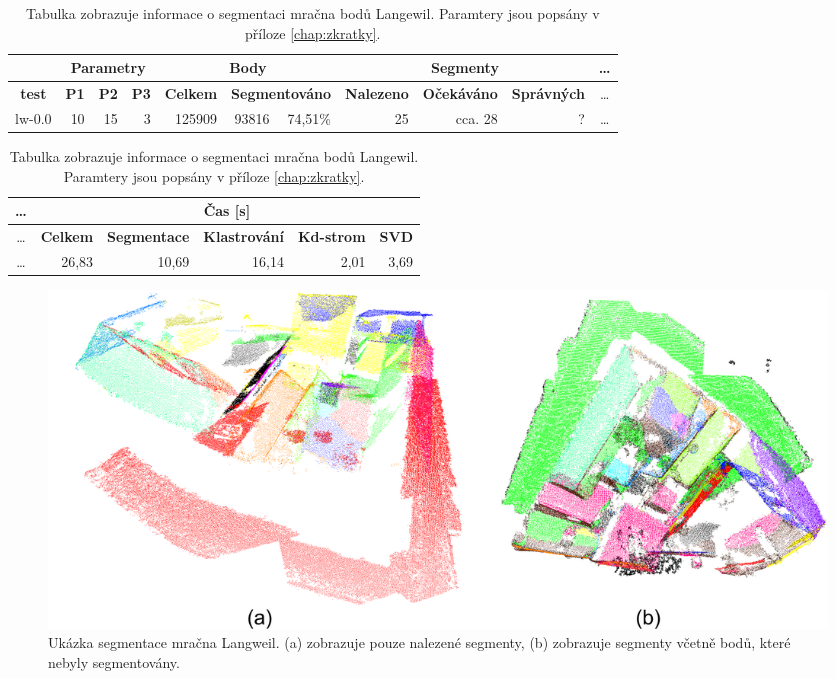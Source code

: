 \documentclass[11pt,twoside,a4paper]{book}
\begin{document}
\begin{table}[ht]
\resizebox{\textwidth}{!} {
\begin{tabular}{|r|r|r|r|r|r|r|r|r|r|c|}
\hline
\textbf{} & \multicolumn{ 3}{c|}{\textbf{Parametry}} & \multicolumn{ 3}{c|}{\textbf{Body}} & \multicolumn{ 3}{c|}{\textbf{Segmenty}} & \ldots\\ \hline
\multicolumn{1}{|c|}{\textbf{test}} & \textbf{P1} & \multicolumn{1}{c|}{\textbf{P2}} & \multicolumn{1}{c|}{\textbf{P3}} & \textbf{Celkem} & \multicolumn{ 2}{c|}{\textbf{Segmentováno}} & \textbf{Nalezeno} & \multicolumn{1}{c|}{\textbf{Očekáváno }} & \multicolumn{1}{c|}{\textbf{Správných}} & \ldots\\ \hline
lw-0.0 & \multicolumn{1}{r|}{10} & \multicolumn{1}{r|}{15} & \multicolumn{1}{r|}{3} & \multicolumn{1}{r|}{125909} & \multicolumn{1}{r|}{93816} & \multicolumn{1}{r|}{74,51\%} & \multicolumn{1}{r|}{25} & \multicolumn{1}{r|}{cca. 28} & \multicolumn{1}{r|}{?} & \ldots\\ \hline
\end{tabular}
}
\begin{flushright} \scalebox{0.9} {
\begin{tabular}{|c|r|r|r|r|r|}
\hline
\ldots& \multicolumn{ 5}{|c|}{\textbf{Čas [s]}} \\ \hline
\ldots& \textbf{Celkem} & \multicolumn{1}{c|}{\textbf{Segmentace}} & \multicolumn{1}{c|}{\textbf{Klastrování}} & \multicolumn{1}{c|}{\textbf{Kd-strom}} & \multicolumn{1}{c|}{\textbf{SVD}} \\ \hline
\ldots& \multicolumn{1}{|r|}{26,83} & \multicolumn{1}{r|}{10,69} & \multicolumn{1}{r|}{16,14} & \multicolumn{1}{r|}{2,01} & \multicolumn{1}{r|}{3,69} \\ \hline
\end{tabular}

}\end{flushright}

\caption{Tabulka zobrazuje informace o segmentaci mračna bodů Langewil. Paramtery jsou popsány v příloze \ref{chap:zkratky}.} 
\label{table:test-lw}
\end{table}

\begin{figure}[ht]
\begin{center}
\includegraphics[width=\textwidth]{figures/test-lw}
\caption{Ukázka segmentace mračna Langweil. (a) zobrazuje pouze nalezené segmenty, (b) zobrazuje segmenty včetně bodů, které nebyly segmentovány.}
\label{fig:test-lw}
\end{center}
\end{figure}
\end{document}
